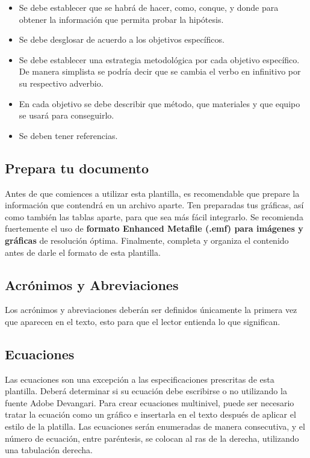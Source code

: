     \begin{itemize}
        \item Se debe establecer que se habrá de hacer, como, conque, y donde para obtener la información que permita probar la hipótesis.  
        \item Se debe desglosar de acuerdo a los objetivos específicos. 
        \item Se debe establecer una estrategia metodológica por cada objetivo específico. De manera simplista se podría decir que se cambia el verbo en infinitivo por su respectivo adverbio.
        \item En cada objetivo se debe describir que método, que materiales y que equipo se usará para conseguirlo.
        \item Se deben tener referencias.
    \end{itemize}
    \begin{figure} [H]
    
    \end{figure}
    
    \subsection{Prepara tu documento}
    
    Antes de que comiences a utilizar esta plantilla, es recomendable que prepare la información que contendrá en un archivo aparte. 
    Ten preparadas tus gráficas, así como también las tablas aparte, para que sea más fácil integrarlo. 
    Se recomienda fuertemente el uso de \textbf{formato Enhanced Metafile (.emf) para imágenes y gráficas} de resolución óptima. 
    Finalmente, completa y organiza el contenido antes de darle el formato de esta plantilla. 
    
    \subsection{Acrónimos y Abreviaciones}
    
    Los acrónimos y abreviaciones deberán ser definidos únicamente la primera vez que aparecen en el texto, esto para que el lector entienda lo que significan.
    
    \subsection{Ecuaciones}
    
    Las ecuaciones son una excepción a las especificaciones prescritas de esta plantilla. 
    Deberá determinar si su ecuación debe escribirse o no utilizando la fuente Adobe Devangari. 
    Para crear ecuaciones multinivel, puede ser necesario tratar la ecuación como un gráfico e insertarla en el texto después de aplicar el estilo de la platilla.
    Las ecuaciones serán enumeradas de manera consecutiva, y el número de ecuación, entre paréntesis, se colocan al ras de la derecha, utilizando una tabulación derecha. 
    
